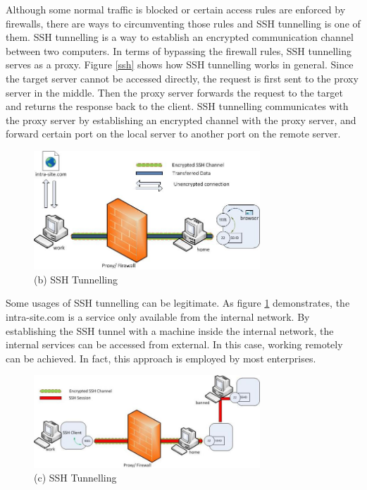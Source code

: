 \documentclass{article}
\begin{document}
Although some normal traffic is blocked or certain access rules are enforced by firewalls, there are ways 
to circumventing those rules and SSH tunnelling is one of them. 
SSH tunnelling is a way to establish an encrypted communication channel between two computers. In terms of 
bypassing the firewall rules, SSH tunnelling serves as a proxy. 
Figure \ref{ssh} shows how SSH tunnelling works in general.
Since the target server cannot be accessed directly, the request is first sent to the proxy 
server in the middle. Then the proxy server forwards the request to the target and returns the response 
back to the client. SSH tunnelling communicates with the proxy server by establishing an encrypted channel with 
the proxy server, and forward certain port on the local server to another port on the remote server.

\begin{figure}[H]
  \includegraphics[width=8.5cm]{ssh1}
  \caption{(b) SSH Tunnelling\cite{chamith_2012}}
  \label{ssh1}
\end{figure}

Some usages of SSH tunnelling can be legitimate. As figure \ref{ssh1} demonstrates, the intra-site.com is 
a service only available from the internal network. By establishing the SSH tunnel with a machine inside the internal 
network, the internal services can be accessed from external. In this case, working remotely can be achieved. 
In fact, this approach is employed by most enterprises.

\begin{figure}[H]
  \includegraphics[width=8.5cm]{ssh2}
  \caption{(c) SSH Tunnelling \cite{chamith_2012}}
  \label{ssh2}
\end{figure}
\end{document}
